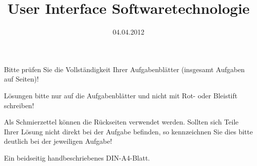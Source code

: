 \documentclass{uulm-exam}
\begin{document}
\title{User Interface Softwaretechnologie}
\date{04.04.2012}

\begin{hints}
\begin{hintslist}
\item Bitte prüfen Sie die Vollständigkeit Ihrer Aufgabenblätter
(insgesamt \gettotalassignments{} Aufgaben auf \pageref{LastPage} Seiten)!
\item Lösungen bitte nur auf die Aufgabenblätter und nicht mit Rot- oder
Bleistift schreiben!
\item Als Schmierzettel können die Rückseiten verwendet werden.
Sollten sich Teile Ihrer Lösung nicht direkt bei der Aufgabe befinden, so
kennzeichnen Sie dies bitte deutlich bei der jeweiligen Aufgabe!
\end{hintslist}
\end{hints}

\begin{tools}
Ein beidseitig handbeschriebenes DIN-A4-Blatt.
\end{tools}

\maketitle

\begin{assignments}


\end{assignments}

\newpage
\makeemptysheet
\makeemptysheet
\makeemptysheet

% 
\end{document}
